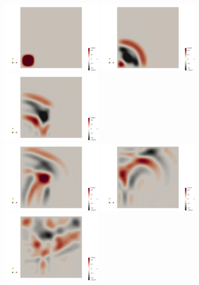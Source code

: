 \begin{center}
\includegraphics[width=5cm]{python_codes/fieldstone_165/results3/uu0000.png}
\includegraphics[width=5cm]{python_codes/fieldstone_165/results3/uu0025.png}
\includegraphics[width=5cm]{python_codes/fieldstone_165/results3/uu0050.png}\\
\includegraphics[width=5cm]{python_codes/fieldstone_165/results3/uu0075.png}
\includegraphics[width=5cm]{python_codes/fieldstone_165/results3/uu0100.png}
\includegraphics[width=5cm]{python_codes/fieldstone_165/results3/uu0150.png}
\end{center}





